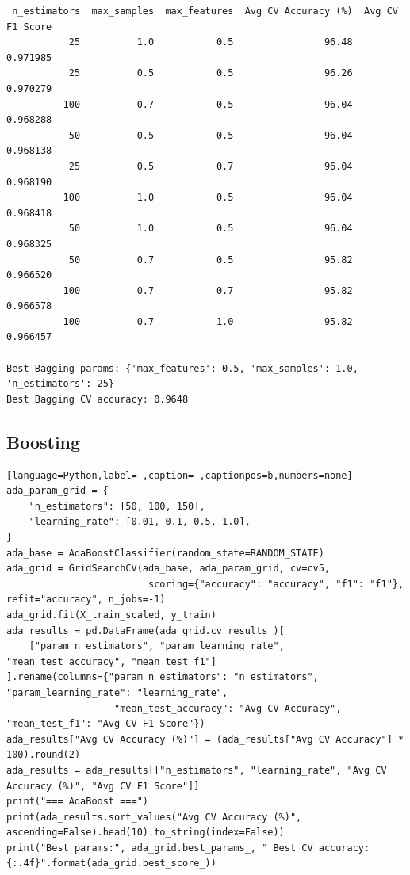 \documentclass[12pt,a4paper]{article}
\begin{document}
\begin{verbatim}
 n_estimators  max_samples  max_features  Avg CV Accuracy (%)  Avg CV F1 Score
           25          1.0           0.5                96.48         0.971985
           25          0.5           0.5                96.26         0.970279
          100          0.7           0.5                96.04         0.968288
           50          0.5           0.5                96.04         0.968138
           25          0.5           0.7                96.04         0.968190
          100          1.0           0.5                96.04         0.968418
           50          1.0           0.5                96.04         0.968325
           50          0.7           0.5                95.82         0.966520
          100          0.7           0.7                95.82         0.966578
          100          0.7           1.0                95.82         0.966457

Best Bagging params: {'max_features': 0.5, 'max_samples': 1.0, 'n_estimators': 25}
Best Bagging CV accuracy: 0.9648
\end{verbatim}

\subsection{Boosting}
\label{sec:org252610f}
\begin{lstlisting}[language=Python,label= ,caption= ,captionpos=b,numbers=none]
ada_param_grid = {
    "n_estimators": [50, 100, 150],
    "learning_rate": [0.01, 0.1, 0.5, 1.0],
}
ada_base = AdaBoostClassifier(random_state=RANDOM_STATE)
ada_grid = GridSearchCV(ada_base, ada_param_grid, cv=cv5,
                         scoring={"accuracy": "accuracy", "f1": "f1"}, refit="accuracy", n_jobs=-1)
ada_grid.fit(X_train_scaled, y_train)
ada_results = pd.DataFrame(ada_grid.cv_results_)[
    ["param_n_estimators", "param_learning_rate", "mean_test_accuracy", "mean_test_f1"]
].rename(columns={"param_n_estimators": "n_estimators", "param_learning_rate": "learning_rate",
                   "mean_test_accuracy": "Avg CV Accuracy", "mean_test_f1": "Avg CV F1 Score"})
ada_results["Avg CV Accuracy (%)"] = (ada_results["Avg CV Accuracy"] * 100).round(2)
ada_results = ada_results[["n_estimators", "learning_rate", "Avg CV Accuracy (%)", "Avg CV F1 Score"]]
print("=== AdaBoost ===")
print(ada_results.sort_values("Avg CV Accuracy (%)", ascending=False).head(10).to_string(index=False))
print("Best params:", ada_grid.best_params_, " Best CV accuracy: {:.4f}".format(ada_grid.best_score_))
\end{lstlisting}
\end{document}
